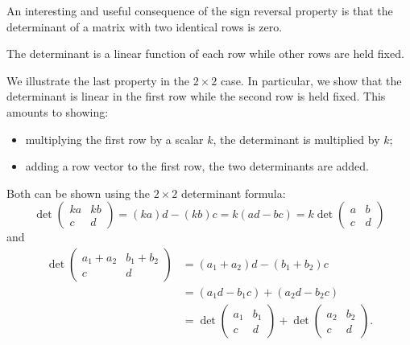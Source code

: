 \documentclass{ximera}
\begin{document}
An interesting and useful consequence of the sign reversal property is
that the determinant of a matrix with two identical rows is zero.

\begin{proposition}[Multilinearity]
  The determinant is a linear function of each row while other rows
  are held fixed.
\end{proposition}

We illustrate the last property in the $2 \times 2$ case. In particular, we
show that the determinant is linear in the first row while the second
row is held fixed. This amounts to showing:
\begin{itemize}
\item multiplying the first row by a scalar $k$, the determinant is
  multiplied by $k$;
\item adding a row vector to the first row, the two determinants are added.
\end{itemize}

Both can be shown using the $2 \times 2$ determinant formula:
\[
  \det
  \begin{pmatrix}
    k a & k b \\
    c & d
  \end{pmatrix}
  = (k a)d - (k b)c
  = k (ad - bc)
  = k \det
  \begin{pmatrix}
    a & b \\
    c & d
  \end{pmatrix}
\]
and
\begin{align*}
  \det
  \begin{pmatrix}
    a_1 + a_2 & b_1 + b_2 \\
    c & d
  \end{pmatrix}
  & = (a_1 + a_2) d - (b_1 + b_2) c \\
  & = (a_1 d - b_1 c) + (a_2 d - b_2 c) \\
  & = \det
  \begin{pmatrix}
    a_1 & b_1 \\
    c & d
  \end{pmatrix}
  + \det
  \begin{pmatrix}
    a_2 & b_2 \\
    c & d
  \end{pmatrix}.
\end{align*}
\end{document}
